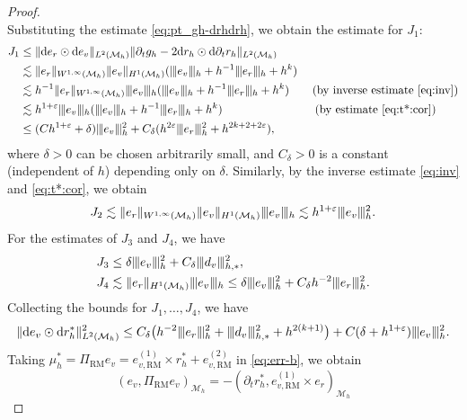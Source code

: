 \documentclass[11pt,a4paper,oneside,reqno]{amsart}
\theoremstyle{definition}
\theoremstyle{plain}
\numberwithin{theorem}{section}
\numberwithin{proposition}{section}
\numberwithin{lemma}{section}
\numberwithin{equation}{section}
\newcommand{\Man}{\mathcal{M}}
\newcommand{\RM}{\mathrm{RM}}
\newcommand{\normt}[1]{%
	\vert\kern-0.9pt\vert\kern-0.9pt\vert #1
	\vert\kern-0.9pt\vert\kern-0.9pt\vert}
\begin{document}
\begin{proof}
\begin{equation}
\end{equation} 
Substituting the estimate \eqref{eq:pt_gh-drhdrh}, we obtain the estimate for $J_1$: 
\[ \begin{aligned}
    J_1 &\le  
\|  \mathrm{d} e_{r} \odot \mathrm{d} e_{v} \|_{L^2(\Man_h)}\| \partial_t g_h - 2 \mathrm{d} r_h \odot \mathrm{d} \partial_t r_h \|_{L^2(\Man_h)}\\
&\lesssim \|  e_{r} \|_{W^{1,\infty}(\Man_h)} \| e_v \|_{H^1(\Man_h)}
(\normt{ e_v }_{h} + h^{-1} \normt{e_r}_h + h^k ) \\ 
&\lesssim h^{-1}\|  e_{r} \|_{W^{1,\infty}(\Man_h)} \normt{e_v}_h 
(\normt{ e_v }_{h} + h^{-1} \normt{e_r}_h + h^k)
\qquad \text{(by inverse estimate \eqref{eq:inv})}
\\ 
&\lesssim h^{1+\varepsilon} \normt{e_v}_h
(\normt{ e_v }_{h} + h^{-1} \normt{e_r}_h + h^k )
\qquad\qquad\qquad\qquad \text{(by estimate \eqref{eq:t*:cor})}\\
& \leq (Ch^{1+\varepsilon} + \delta ) \normt{e_v}_h^2 
+ C_{\delta}( h^{2\varepsilon} \normt{e_r}_h^2 + h^{2k+2+2\varepsilon} ),
\end{aligned}
\]
where $\delta>0$ can be chosen arbitrarily small, and $C_{\delta}>0$ is a constant (independent of $h$) depending only on $\delta$. 
Similarly, by the inverse estimate \eqref{eq:inv} and \eqref{eq:t*:cor}, we obtain
\[
J_2 \lesssim
\| e_r \|_{W^{1,\infty}(\Man_h)} \| e_v \|_{H^1(\Man_h)} \normt{e_v}_h
\lesssim h^{1+\varepsilon} \normt{e_v}_h^2.
\]
For the estimates of \(J_3\) and \(J_4\), we have
\begin{subequations}
\begin{align}
J_3 & \leq \delta \normt{e_v}_h^2 + C_{\delta} \normt{d_v}_{h,*}^2, \notag \\
J_4 &\lesssim \|e_r\|_{H^1(\Man_h)}\normt{e_v}_h
\leq \delta \normt{e_v}_h^2 +
C_{\delta}h^{-2}\normt{e_r}_h^2. \notag
\end{align}
\end{subequations}
Collecting the bounds for $J_1,\ldots,J_4$, we have
\begin{equation}\label{eq:devdr}
    \|\mathrm{d} e_{v} \odot \mathrm{d} r_h^{*}\|_{L^2(\Man_h)}^2
\leq 
C_{\delta}\big( 
h^{-2}\normt{e_r}_h^2 + \normt{ d_v }_{h,*}^2 + h^{2(k+1)}\big) 
+ C(\delta + h^{1+\varepsilon}) \normt{e_v}^2_h.
\end{equation}
Taking $\mu_h^* = \Pi_{\RM} e_v = e_{v, \RM}^{(1)} \times r_h^* +  e_{v, \RM}^{(2)}$ in \eqref{eq:err-b}, we obtain 
\[ 
    (e_v, \Pi_{\RM} e_v)_{\Man_h} 
     = - (\partial_t r_h^*,  e_{v, \RM}^{(1)} \times e_r)_{\Man_h} 
\]
\end{proof}
\end{document}
